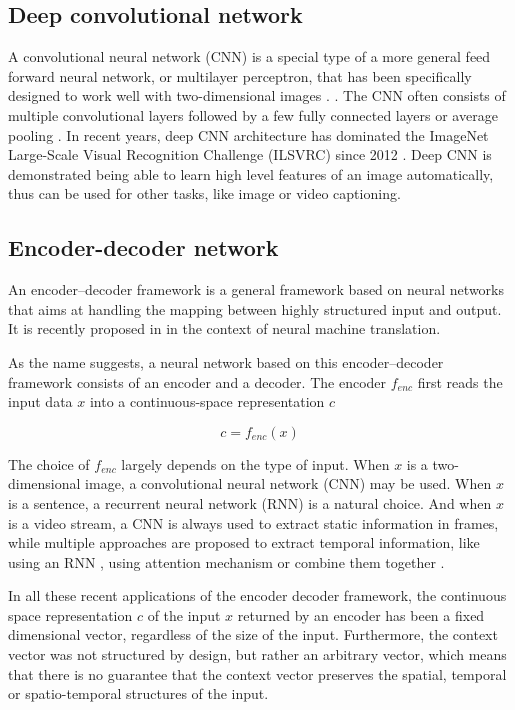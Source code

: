 \subsection{Deep convolutional network}
A convolutional neural network (CNN) is a special type of a more general feed forward neural network, or multilayer perceptron, that has been specifically designed to work well with two-dimensional images \cite{lecun1998gradient}. . The CNN often consists of multiple convolutional layers followed by a few fully connected layers or average pooling \cite{lin2013network,szegedy2015going}. In recent years, deep CNN architecture has dominated the ImageNet Large-Scale Visual Recognition Challenge (ILSVRC) since 2012 \cite{krizhevsky2012imagenet,simonyan2014very,szegedy2015going,he2015deep}. Deep CNN is demonstrated being able to learn high level features of an image automatically\cite{zeiler2014visualizing}, thus can be used for other tasks, like image or video captioning.

\subsection{Encoder-decoder network}
An encoder–decoder framework is a general framework based on neural networks that aims at handling the mapping between highly structured input and output. It is recently proposed in \cite{sutskever2014sequence,cho2014learning} in the context of neural machine translation.

As the name suggests, a neural network based on this encoder–decoder framework consists of an encoder and a decoder. The encoder $f_{enc}$ first reads the input data $x$ into a continuous-space representation $c$

\begin{equation}
c=f_{enc}(x)
\end{equation}

The choice of $f_{enc}$ largely depends on the type of input. When $x$ is a two-dimensional image, a convolutional neural network (CNN) may be used. When $x$ is a sentence, a recurrent neural network (RNN) is a natural choice. And when $x$ is a video stream, a CNN is always used to extract static information in frames, while multiple approaches are proposed to extract temporal information, like using an RNN \cite{venugopalan2015sequence}, using attention mechanism \cite{yao2015describing} or combine them together \cite{pan2015hierarchical}.

In all these recent applications of the encoder decoder framework, the continuous space representation $c$ of the input $x$ returned by an encoder has been a fixed dimensional vector, regardless of the size of the input. Furthermore, the context vector was not structured by design, but rather an arbitrary vector, which means that there is no guarantee that the context vector preserves the spatial, temporal or spatio-temporal structures of the input.

